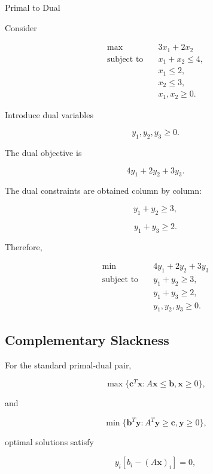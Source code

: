 \begin{workedexamplebox}{Primal to Dual}

Consider

\[
\begin{aligned}
\max
\quad&
3x_1+2x_2
\\
\text{subject to}
\quad&
x_1+x_2\leq4,
\\
&
x_1\leq2,
\\
&
x_2\leq3,
\\
&
x_1,x_2\geq0.
\end{aligned}
\]

Introduce dual variables

\[
y_1,y_2,y_3\geq0.
\]

The dual objective is

\[
4y_1+2y_2+3y_3.
\]

The dual constraints are obtained column by column:

\[
y_1+y_2\geq3,
\]

\[
y_1+y_3\geq2.
\]

Therefore,

\begin{answerbox}
\[
\boxed{
\begin{aligned}
\min
\quad&
4y_1+2y_2+3y_3
\\
\text{subject to}
\quad&
y_1+y_2\geq3,
\\
&
y_1+y_3\geq2,
\\
&
y_1,y_2,y_3\geq0.
\end{aligned}
}
\]
\end{answerbox}

\end{workedexamplebox}

\subsection{Complementary Slackness}
\label{subsec:lp-complementary-slackness}

For the standard primal-dual pair,

\[
\max
\{
\mathbf{c}^T\mathbf{x}:
A\mathbf{x}\leq\mathbf{b},
\mathbf{x}\geq0
\},
\]

and

\[
\min
\{
\mathbf{b}^T\mathbf{y}:
A^T\mathbf{y}\geq\mathbf{c},
\mathbf{y}\geq0
\},
\]

optimal solutions satisfy

\[
\boxed{
y_i
[
b_i-(A\mathbf{x})_i
]
=
0,
}
\]

